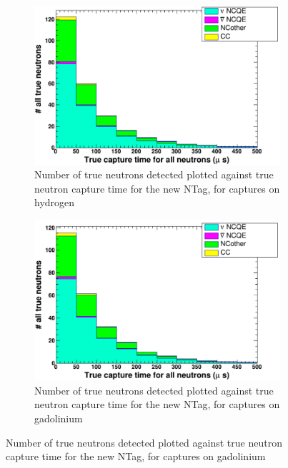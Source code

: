 \begin{figure}
    \centering
     \begin{subfigure}[b]{0.49\linewidth}
      \includegraphics[width=\linewidth]{Figures/TruCapTimeReductionNewH.PNG}
      \caption{Number of true neutrons detected plotted against true neutron capture time for the new NTag, for captures on hydrogen}
      \label{fig:TruCapTimeReductionNewH} 
     \end{subfigure}
     \begin{subfigure}[b]{0.49\linewidth}
       \includegraphics[width=\linewidth]{Figures/TruCapTimeReductionNewGd.PNG}
        \caption{Number of true neutrons detected plotted against true neutron capture time for the new NTag, for captures on gadolinium} 
     \label{fig:TruCapTimeReductionNewGd}
      \end{subfigure} 
\end{figure}


